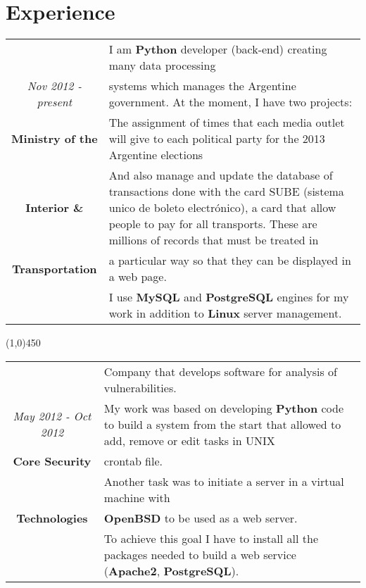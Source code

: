 \section{Experience}

\begin{tabular}{c|p{12.5cm}}
& \large I am \textbf{Python} developer (back-end) creating many data processing\\
\large\textit{Nov 2012 - present} &  \large systems which manages the Argentine government. At the moment, I have two projects:\\
\large\textbf{Ministry of the} & \large The assignment of times that each media outlet will give to each political party for the 2013 Argentine elections\\
\large\textbf{Interior \&}& \large And also manage and update the database of transactions done with the card SUBE (sistema unico de boleto electrónico), a card that allow people to pay for all transports. These are millions of records that must be treated in \\
 \large\textbf{Transportation} & \large a particular way so that they can be displayed in a web page.\\
& \large I use \textbf{MySQL} and \textbf{PostgreSQL} engines for my work in addition to \textbf{Linux} server management.\\
\end{tabular}

\begin{center}
\line(1,0){450}
\end{center}
\begin{tabular}{c|p{12.5cm}}
& \large Company that develops software for analysis of vulnerabilities.\\
\large\textit{May 2012 - Oct 2012} &  \large My work was based on developing \textbf{Python} code to build a system from the start that allowed to add, remove or edit tasks in UNIX\\
\large\textbf{Core Security} & \large  crontab file.\\
 & \large  Another task was to initiate a server in a virtual machine with \\
\large\textbf{Technologies} & \large\textbf{OpenBSD} to be used as a web server. \\
& \large To achieve this goal I have to install all the packages needed to build a web service (\textbf{Apache2}, \textbf{PostgreSQL}). \\
\end{tabular}

